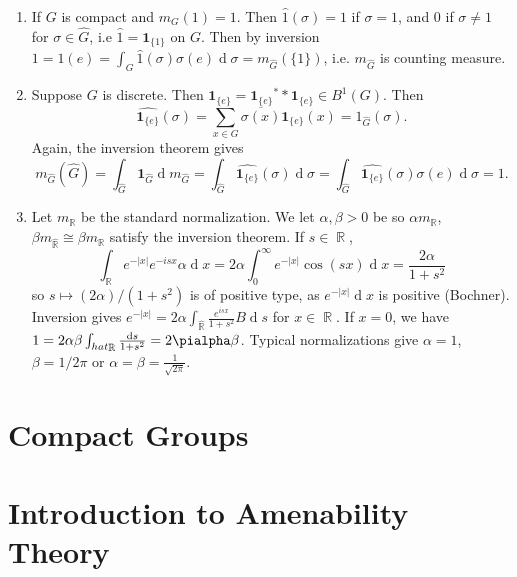\documentclass[11pt, a4paper]{memoir}
\DeclareMathOperator{\R}{{\mathbb{R}}}
\theoremstyle{change}
\theoremstyle{plain}
\theoremstyle{nonumberplain}
\renewcommand{\d}[1]{\ensuremath{\operatorname{d}\!{#1}}}
\newcommand{\idc}[1]{\ensuremath{\mathbf{1}_{#1}}}
\numberwithin{equation}{section}
\begin{document}
\begin{enumerate}[nl]
    \item If $G$ is compact and $m_G(1)=1$.
        Then $\hat{1}(\sigma)=1$ if $\sigma=1$, and $0$ if $\sigma\neq 1$ for $\sigma\in\widehat{G}$, i.e $\hat{1}=\idc{\{1\}}$ on $G$.
        Then by inversion $1=1(e)=\int_G\hat{1}(\sigma)\sigma(e)\d{\sigma}=m_{\widehat{G}}(\{1\})$, i.e. $m_{\widehat{G}}$ is counting measure.
    \item Suppose $G$ is discrete.
        Then $\idc{\{e\}}=\idc{\{e\}}^**\idc{\{e\}}\in B^1(G)$.
        Then
        \begin{equation*}
            \widehat{\idc{\{e\}}}(\sigma)=\sum_{x\in G}\overline{\sigma(x)}\idc{\{e\}}(x)=1_{\widehat{G}}(\sigma).
        \end{equation*}
        Again, the inversion theorem gives
        \begin{equation*}
            m_{\widehat{G}}(\widehat{G}) = \int_{\widehat{G}}\idc{\widehat{G}}\d{m_{\widehat{G}}}=\int_{\widehat{G}}\hat{\idc{\{e\}}}(\sigma)\d{\sigma}=\int_{\widehat{G}}\hat{\idc{\{e\}}}(\sigma)\sigma(e)\d{\sigma}=1.
        \end{equation*}
    \item Let $m_{\R}$ be the standard normalization.
        We let $\alpha,\beta>0$ be so $\alpha m_{\R}$, $\beta m_{\hat{\R}}\cong\beta m_{\R}$ satisfy the inversion theorem.
        If $s\in\R$,
        \begin{equation*}
            \int_{\R}e^{-|x|}e^{-isx}\alpha\d{x}=2\alpha\int_0^\infty e^{-|x|}\cos(sx)\d{x}=\frac{2\alpha}{1+s^2}
        \end{equation*}
        so $s\mapsto (2\alpha)/(1+s^2)$ is of positive type, as $e^{-|x|}\d{x}$ is positive (Bochner).
        Inversion gives $e^{-|x|}=2\alpha\int_{\hat{\R}}\frac{e^{isx}}{1+s^2}B\d{s}$ for $x\in\R$.
        If $x=0$, we have $1=2\alpha\beta\int_{hat{\R}}\frac{\d{s}}{1+s^2}=2\pialpha\beta$.
        Typical normalizations give $\alpha=1$, $\beta=1/2\pi$ or $\alpha=\beta=\frac{1}{\sqrt{2\pi}}$.
\end{enumerate}
\section{Compact Groups}
\section{Introduction to Amenability Theory}
\end{document}
